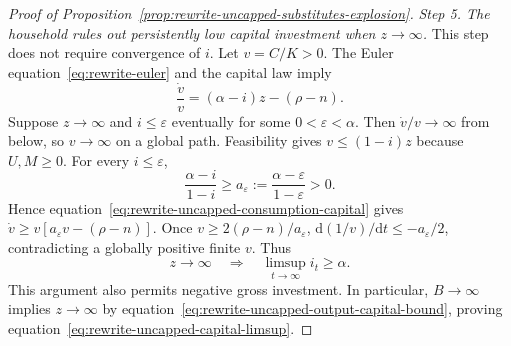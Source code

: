 \begin{proof}[Proof of Proposition~\ref{prop:rewrite-uncapped-substitutes-explosion}]
\textit{Step 5. The household rules out persistently low capital investment when $z\to\infty$.}
This step does not require convergence of $i$. Let $v=C/K>0$.
The Euler equation~\eqref{eq:rewrite-euler} and the capital law imply
\begin{equation}
 \frac{\dot v}{v}=(\alpha-i)z-(\rho-n).
 \label{eq:rewrite-uncapped-consumption-capital}
\end{equation}
Suppose $z\to\infty$ and $i\leq\varepsilon$ eventually for some
$0<\varepsilon<\alpha$. Then $\dot v/v\to\infty$ from below, so $v\to\infty$
on a global path. Feasibility gives $v\leq(1-i)z$ because $U,M\geq0$.
For every $i\leq\varepsilon$,
\[
 \frac{\alpha-i}{1-i}\geq
 a_\varepsilon:=\frac{\alpha-\varepsilon}{1-\varepsilon}>0.
\]
Hence equation~\eqref{eq:rewrite-uncapped-consumption-capital} gives
$\dot v\geq v[a_\varepsilon v-(\rho-n)]$.
Once $v\geq2(\rho-n)/a_\varepsilon$,
$\mathrm d(1/v)/\mathrm dt\leq-a_\varepsilon/2$, contradicting a globally
positive finite $v$. Thus
\begin{equation}
 z\to\infty\quad\Longrightarrow\quad\limsup_{t\to\infty}i_t\geq\alpha.
 \label{eq:rewrite-uncapped-capital-incentive-bound}
\end{equation}
This argument also permits negative gross investment. In particular,
$B\to\infty$ implies $z\to\infty$ by
equation~\eqref{eq:rewrite-uncapped-output-capital-bound}, proving
equation~\eqref{eq:rewrite-uncapped-capital-limsup}.


\end{proof}
